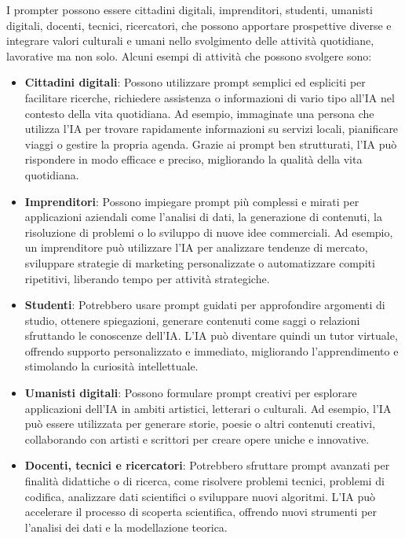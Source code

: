     I prompter possono essere cittadini digitali, imprenditori, studenti, umanisti digitali, docenti, tecnici, ricercatori, che possono apportare prospettive diverse e integrare valori culturali e umani nello svolgimento delle attività quotidiane, lavorative ma non solo. Alcuni esempi di attività che possono svolgere sono:
    \begin{itemize}
        \item \textbf{Cittadini digitali}: Possono utilizzare prompt semplici ed espliciti per facilitare ricerche, richiedere assistenza o informazioni di vario tipo all'IA nel contesto della vita quotidiana. Ad esempio, immaginate una persona che utilizza l'IA per trovare rapidamente informazioni su servizi locali, pianificare viaggi o gestire la propria agenda. Grazie ai prompt ben strutturati, l'IA può rispondere in modo efficace e preciso, migliorando la qualità della vita quotidiana.

        \item \textbf{Imprenditori}: Possono impiegare prompt più complessi e mirati per applicazioni aziendali come l'analisi di dati, la generazione di contenuti, la risoluzione di problemi o lo sviluppo di nuove idee commerciali. Ad esempio, un imprenditore può utilizzare l'IA per analizzare tendenze di mercato, sviluppare strategie di marketing personalizzate o automatizzare compiti ripetitivi, liberando tempo per attività strategiche.

        \item \textbf{Studenti}: Potrebbero usare prompt guidati per approfondire argomenti di studio, ottenere spiegazioni, generare contenuti come saggi o relazioni sfruttando le conoscenze dell'IA. L'IA può diventare quindi un tutor virtuale, offrendo supporto personalizzato e immediato, migliorando l'apprendimento e stimolando la curiosità intellettuale.

        \item \textbf{Umanisti digitali}: Possono formulare prompt creativi per esplorare applicazioni dell'IA in ambiti artistici, letterari o culturali. Ad esempio, l'IA può essere utilizzata per generare storie, poesie o altri contenuti creativi, collaborando con artisti e scrittori per creare opere uniche e innovative.

        \item \textbf{Docenti, tecnici e ricercatori}: Potrebbero sfruttare prompt avanzati per finalità didattiche o di ricerca, come risolvere problemi tecnici, problemi di codifica, analizzare dati scientifici o sviluppare nuovi algoritmi. L'IA può accelerare il processo di scoperta scientifica, offrendo nuovi strumenti per l'analisi dei dati e la modellazione teorica.
    \end{itemize}

